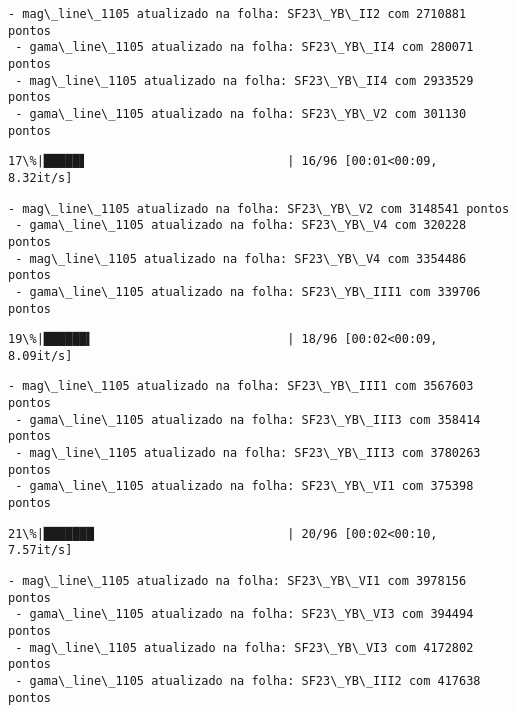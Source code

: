 \documentclass[11pt]{article}
\begin{document}
    \begin{Verbatim}[commandchars=\\\{\}]
 - mag\_line\_1105 atualizado na folha: SF23\_YB\_II2 com 2710881 pontos
 - gama\_line\_1105 atualizado na folha: SF23\_YB\_II4 com 280071 pontos
 - mag\_line\_1105 atualizado na folha: SF23\_YB\_II4 com 2933529 pontos
 - gama\_line\_1105 atualizado na folha: SF23\_YB\_V2 com 301130 pontos
    \end{Verbatim}

    \begin{Verbatim}[commandchars=\\\{\}]
 17\%|█████▋                            | 16/96 [00:01<00:09,  8.32it/s]
    \end{Verbatim}

    \begin{Verbatim}[commandchars=\\\{\}]
 - mag\_line\_1105 atualizado na folha: SF23\_YB\_V2 com 3148541 pontos
 - gama\_line\_1105 atualizado na folha: SF23\_YB\_V4 com 320228 pontos
 - mag\_line\_1105 atualizado na folha: SF23\_YB\_V4 com 3354486 pontos
 - gama\_line\_1105 atualizado na folha: SF23\_YB\_III1 com 339706 pontos
    \end{Verbatim}

    \begin{Verbatim}[commandchars=\\\{\}]
 19\%|██████▍                           | 18/96 [00:02<00:09,  8.09it/s]
    \end{Verbatim}

    \begin{Verbatim}[commandchars=\\\{\}]
 - mag\_line\_1105 atualizado na folha: SF23\_YB\_III1 com 3567603 pontos
 - gama\_line\_1105 atualizado na folha: SF23\_YB\_III3 com 358414 pontos
 - mag\_line\_1105 atualizado na folha: SF23\_YB\_III3 com 3780263 pontos
 - gama\_line\_1105 atualizado na folha: SF23\_YB\_VI1 com 375398 pontos
    \end{Verbatim}

    \begin{Verbatim}[commandchars=\\\{\}]
 21\%|███████                           | 20/96 [00:02<00:10,  7.57it/s]
    \end{Verbatim}

    \begin{Verbatim}[commandchars=\\\{\}]
 - mag\_line\_1105 atualizado na folha: SF23\_YB\_VI1 com 3978156 pontos
 - gama\_line\_1105 atualizado na folha: SF23\_YB\_VI3 com 394494 pontos
 - mag\_line\_1105 atualizado na folha: SF23\_YB\_VI3 com 4172802 pontos
 - gama\_line\_1105 atualizado na folha: SF23\_YB\_III2 com 417638 pontos
    \end{Verbatim}
\end{document}
